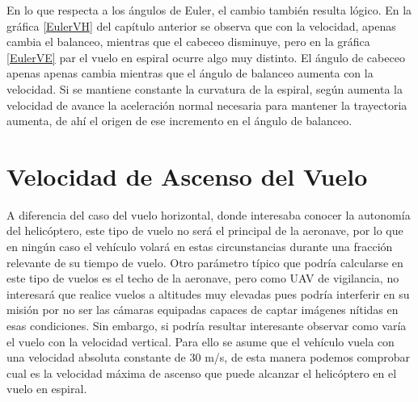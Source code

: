 En lo que respecta a los ángulos de Euler, el cambio también resulta lógico. En la gráfica \ref{EulerVH} del capítulo anterior se observa que con la velocidad, apenas cambia el balanceo, mientras que el cabeceo disminuye, pero en la gráfica \ref{EulerVE} par el vuelo en espiral ocurre algo muy distinto.
El ángulo de cabeceo apenas apenas cambia mientras que el ángulo de balanceo aumenta con la velocidad. Si se mantiene constante la curvatura de la espiral, según aumenta la velocidad de avance la aceleración normal necesaria para mantener la trayectoria aumenta, de ahí el origen de ese incremento en el ángulo de balanceo.

\section{Velocidad de Ascenso del Vuelo}

A diferencia del caso del vuelo horizontal, donde interesaba conocer la autonomía del helicóptero, este tipo de vuelo no será el principal de la aeronave, por lo que en ningún caso el vehículo volará en estas circunstancias durante una fracción relevante de su tiempo de vuelo. Otro parámetro típico que podría calcularse en este tipo de vuelos es el techo de la aeronave, pero como UAV de vigilancia, no interesará que realice vuelos a altitudes muy elevadas pues podría interferir en su misión por no ser las cámaras equipadas capaces de captar imágenes nítidas en esas condiciones.
Sin embargo, si podría resultar interesante observar como varía el vuelo con la velocidad vertical. Para ello se asume que el vehículo vuela con una velocidad absoluta constante de 30 m/s, de esta manera podemos comprobar cual es la velocidad máxima de ascenso que puede alcanzar el helicóptero en el vuelo en espiral.

